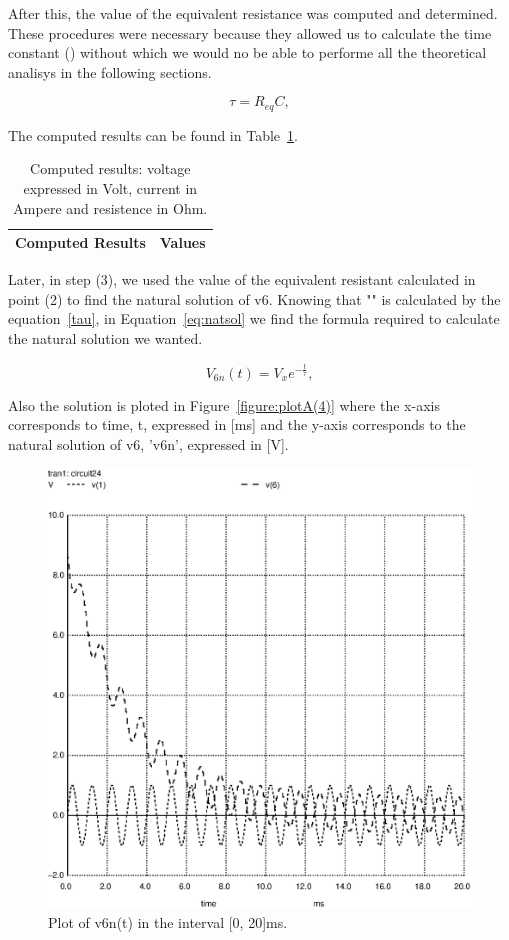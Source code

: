 After this, the value of the equivalent resistance was computed and determined. These procedures were necessary because they allowed us to calculate the time constant (\tau) without which we would no be able to performe all the theoretical analisys in the following sections. 

\begin{equation}
  \tau = R_{eq}C,
  \label{eq:tau}
\end{equation}


The computed results can be found in Table~\ref{tab:TA2}.

\begin{table}[h]
  \centering
  \begin{tabular}{|l|r|}
    \hline    
    {\bf Computed Results} & {\bf Values} \\ \hline
    
  \end{tabular}
  \caption{Computed results: voltage expressed in Volt, current in Ampere and resistence in Ohm.}
  \label{tab:TA2}
\end{table}

Later, in step (3), we used the value of the equivalent resistant calculated in point (2) to find the natural solution of v6. Knowing that "\tau" is calculated by the equation~\ref{tau}, in Equation~\ref{eq:natsol} we find the formula required to calculate the natural solution we wanted. 

\begin{equation}
  V_{6n}(t) = V_{x}e^{-\frac{t}{\tau}},
  \label{eq:natsol}
\end{equation}

Also the solution is ploted in Figure~\ref{figure:plotA(4)} where the x-axis corresponds to time, t, expressed in [ms] and the y-axis corresponds to the natural solution of v6, 'v6n', expressed in [V].

\begin{figure}[h] \centering
\includegraphics[width=0.8\linewidth]{forcedsolution.eps}
\caption{Plot of v6n(t) in the interval [0, 20]ms.}
\label{fig:plotA(4)}
\end{figure}

